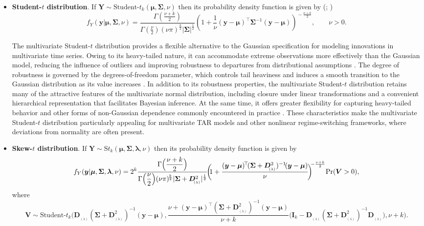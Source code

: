 \begin{itemize}
\item {\bf Student-$t$ distribution}. If $\bm{Y}\sim\text{Student-}t_k(\bm{\mu},\bm{\Sigma},\nu)$ then its probability density function is given by (\citet[example 6.7]{MFE05}; \citet[page 85]{FKN18})
\begin{equation*}
f_{Y}(\bm{y}|\bm{\mu},\bm{\Sigma},\nu)=
\dfrac{\Gamma(\frac{\nu+k}{2})}{\Gamma(\frac{\nu}{2})(\nu\pi)^{\frac{k}{2}}|\bm{\Sigma}|^{\frac{1}{2}}}\!\left(\!\!1+\frac{1}{\nu}(\bm{y}-\bm{\mu})^{\!\top}\bm{\Sigma}^{-1}(\bm{y}-\bm{\mu})\!\!\right)^{\!\!-\frac{\nu+k}{2}},\qquad \nu>0.
\end{equation*}

The multivariate Student-$t$ distribution provides a flexible alternative to the Gaussian specification for modeling innovations in multivariate time series. Owing to its heavy-tailed nature, it can accommodate extreme observations more effectively than the Gaussian model, reducing the influence of outliers and improving robustness to departures from distributional assumptions \citep{Lange1989,AbantoValle2010}. The degree of robustness is governed by the degrees-of-freedom parameter, which controls tail heaviness and induces a smooth transition to the Gaussian distribution as its value increases \citep{Kotz2004}. In addition to its robustness properties, the multivariate Student-$t$ distribution retains many of the attractive features of the multivariate normal distribution, including closure under linear transformations and a convenient hierarchical representation that facilitates Bayesian inference. At the same time, it offers greater flexibility for capturing heavy-tailed behavior and other forms of non-Gaussian dependence commonly encountered in practice \citep{AbantoValle2012}. These characteristics make the multivariate Student-$t$ distribution particularly appealing for multivariate TAR models and other nonlinear regime-switching frameworks, where deviations from normality are often present.

\item {\bf Skew-$t$ distribution}. If $\bm{Y}\sim\text{S}t_k(\bm{\mu},\bm{\Sigma},\bm{\lambda},\nu)$ then its probability density function is given by \citep[page 136]{SDB03}
$$f_{Y}(\bm{y}|\bm{\mu},\bm{\Sigma},\bm{\lambda},\nu)=2^k\dfrac{\Gamma\Big(\dfrac{\nu+k}{2}\Big)}{\Gamma\Big(\dfrac{\nu}{2}\Big)(\nu\pi)^{\!\frac{k}{2}}|\bm{\Sigma}+\bm{D}_{_{\!\!(\lambda)}}^2|^{\frac{1}{2}}} \!\bigg(\!\!1 + \dfrac{(\bm{y}-\bm{\mu})^{\!\top}\!(\bm{\Sigma}+\bm{D}_{_{\!\!(\lambda)}}^2)^{-1}\!(\bm{y}-\bm{\mu})}{\nu}\!\bigg)^{\!\!-\frac{\nu+k}{2}}{\rm Pr}(\bm{V}>0),$$
where 
$$\bm{V}\! \sim\! \text{Student-}t_k\!\Big(\!\bm{D}_{_{\!\!(\lambda)}}\!(\bm{\Sigma}+\bm{D}_{_{\!\!(\lambda)}}^2\!)^{-1}\!(\bm{y}-\bm{\mu}),\!\dfrac{\nu\!+\!(\bm{y}-\bm{\mu})^{\!\top}\!(\bm{\Sigma}\!+\!\bm{D}_{_{\!\!(\lambda)}}^2\!)^{-1}\!(\bm{y}-\bm{\mu})}{\nu+k}\!\big(\bm{I}_k\!-\!\bm{D}_{_{\!\!(\lambda)}}\!(\bm{\Sigma}+\bm{D}_{_{\!\!(\lambda)}}^2\!)^{-1}\!\bm{D}_{_{\!\!(\lambda)}}\!\big),\nu+k\!\Big).$$
\end{itemize}
